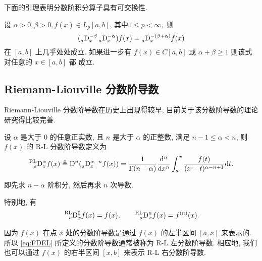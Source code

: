 \documentclass{ecnumaster}
\begin{document}
下面的引理表明分数阶积分算子具有可交换性.
\begin{lemma}
  \cite{SKM93} 设 $\alpha > 0, \beta > 0, f(x) \in L_p[a, b] $, 其中$1 \leq p < \infty,$ 则
  $$
  (\prescript{}{a} {\mathrm{D}} _x^{-\beta}  \prescript{}{a}{\mathrm{D}}_x^{-\alpha})f(x) = \prescript{}{a}{\mathrm{D}}_x^{-(\beta + \alpha)}f(x)
  $$
  在 $[a, b]$ 上几乎处处成立. 如果进一步有 $f(x) \in C[a, b]$ 或 $\alpha + \beta \ge 1$ 则该式对任意的 $x \in [a, b]$ 都
  成立.
\end{lemma}

\subsection{Riemann-Liouville 分数阶导数}
Riemann-Liouville 分数阶导数在历史上出现得较早, 目前关于该分数阶导数的理论研究得比较完善.
\begin{definition}
  设 $\alpha$ 是大于 0 的任意正实数, 且 $n$ 是大于 $\alpha$ 的正整数,
  满足 $n - 1 \le \alpha < n$, 则 $f(x)$ 的 R-L 分数阶导数定义为
  \begin{equation}\label{eq:FDEL}
    \prescript{{\mathrm{RL}}}{a}{\mathrm{D}}_x^{\alpha}f(x) \triangleq {\mathrm{D}}^n(\prescript{}{a}{\mathrm{D}}_x^{\alpha - n}f(x)) = \frac{1}{\Gamma(n - \alpha)}\frac{{\mathrm{d}}^n}{{\mathrm{d}}x^n}\int_{a}^{x}\frac{f(t)}{(x - t)^{\alpha - n + 1}}\mathrm{d}t.
  \end{equation}
\end{definition}
即先求 $n - \alpha$ 阶积分, 然后再求 $n$ 次导数.

特别地, 有
\begin{equation}
  \begin{split}\nonumber
  &\prescript{{\mathrm{RL}}}{a}{\mathrm{D}}_x^0f(x) = f(x),\qquad \prescript{{\mathrm{RL}}}{a}{\mathrm{D}}_x^nf(x) = f^{(n)}(x).\\
  \end{split}
\end{equation}

因为 $f(x)$ 在点 $x$ 处的分数阶导数是通过 $f(x)$ 的左半区间 $[a, x]$ 来表示的.
所以 \eqref{eq:FDEL} 所定义的分数阶导数通常被称为 R-L 左分数阶导数.
相应地, 我们也可以通过 $f(x)$ 的右半区间 $[x, b]$ 来表示 R-L 右分数阶导数.
 
\end{document}
